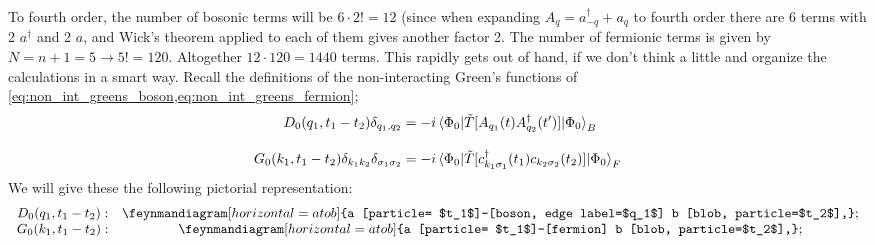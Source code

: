 To fourth order, the number of bosonic terms will be $6\cdot2! = 12 $ (since when expanding $A_q = a_{-q}^\dagger + a_q$ to fourth order there are 6 terms with 2 $a^\dagger$ and 2 $a$, and Wick's theorem applied to each of them gives another factor 2. The number of fermionic terms is given by $N= n+1 = 5 \rightarrow 5! =120. $ Altogether $12\cdot 120 = 1440$ terms. This rapidly gets out of hand, if we don't think a little and organize the calculations in a smart way. 
Recall the definitions of the non-interacting Green's functions of \cref{eq:non_int_greens_boson,eq:non_int_greens_fermion};
\begin{align} 
D_0(q_1, t_1-t_2)\delta_{q_1, q_2} &= -i\ev{\tilde{T}[A_{q_1}(t)A_{q_2}^\dagger(t')]}{\Phi_0}_B\\[2ex]
G_0(k_1, t_1-t_2)\delta_{k_1k_2}\delta_{\sigma_1\sigma_2} &= -i\ev{\tilde{T}[c_{k_1\sigma_1}^\dagger(t_1)c_{k_2\sigma_2}(t_2)]}{\Phi_0}_F
\end{align}
We will give these the following pictorial representation:
\begin{equation}
\begin{array}{cc}
D_0(q_1, t_1-t_2) : & \feynmandiagram[horizontal = a to b]{a [particle= $t_1$]--[boson, edge label=$q_1$] b [blob, particle=$t_2$],}; \\
G_0(k_1, t_1-t_2): & \feynmandiagram[horizontal = a to b]{a [particle= $t_1$]--[fermion] b [blob, particle=$t_2$],};
\end{array}
\end{equation}